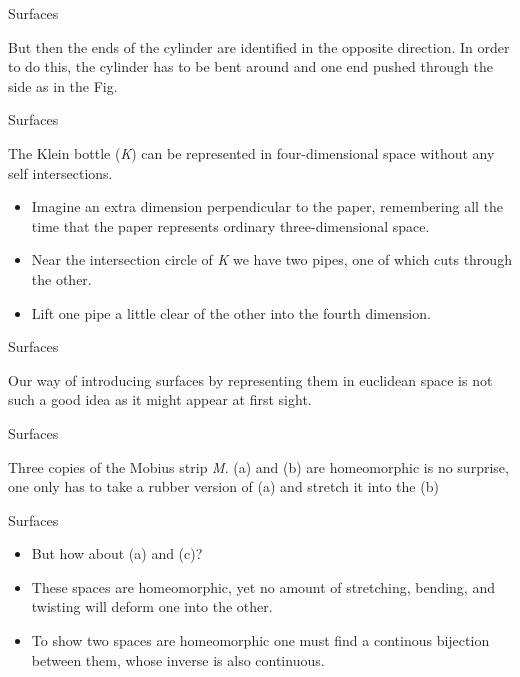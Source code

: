 \documentclass{beamer}
\begin{document}
\begin{frame}{Surfaces}
  \begin{block}{}
    But then the ends of the cylinder are identified in the opposite direction. In order to do this, the cylinder has to be bent around and one end pushed through the side as in the Fig.
  \end{block}
\end{frame}

\begin{frame}{Surfaces}
  \begin{block}{}
    The Klein bottle (\textsl{K}) can be represented in four-dimensional space without any self intersections.
    \begin{itemize}
    \item Imagine an extra dimension perpendicular to the paper, remembering all the time that the paper represents ordinary three-dimensional space.
    \item Near the intersection circle of \textsl{K} we have two pipes, one of which cuts through the other.
    \item Lift one pipe a little clear of the other into the fourth dimension.
    \end{itemize}
  \end{block}
\end{frame}

\begin{frame}{Surfaces}
  \begin{block}{}
    Our way of introducing surfaces by representing them in euclidean space is not such a good idea as it might appear at first sight.
  \end{block}
\end{frame}

\begin{frame}{Surfaces}
  \begin{block}{}
    Three copies of the Mobius strip \textsl{M}. (a) and (b) are homeomorphic is no surprise, one only has to take a rubber version of (a) and stretch it into the (b)
  \end{block}
\end{frame}

\begin{frame}{Surfaces}
  \begin{block}{}
    \begin{itemize}
    \item But how about (a) and (c)?
    \item These spaces are homeomorphic, yet no amount of stretching, bending, and twisting will deform one into the other.
    \item To show two spaces are homeomorphic one must find a continous bijection between them, whose inverse is also continuous.
    \end{itemize}
  \end{block}
\end{frame}
\end{document}
